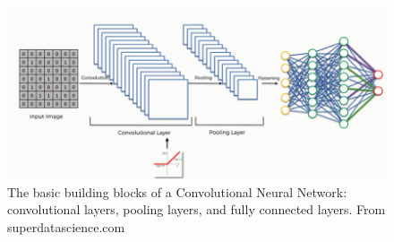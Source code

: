 \begin{figure}[h!]
\begin{center}
\includegraphics[width = 13cm]{img/convlution.png}
\caption[The basic building blocks of a Convolutional Neural Network]{The basic building blocks of a Convolutional Neural Network: convolutional layers, pooling layers, and fully connected layers. From superdatascience.com \label{fig_CNN}}
\end{center}
\end{figure}

